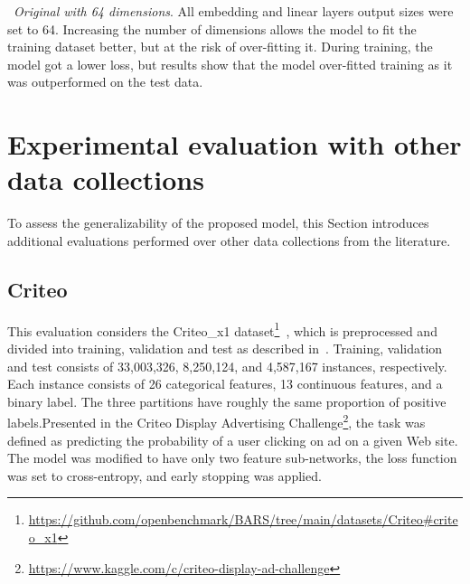 \documentclass[manuscript,nonacm]{acmart}
\begin{document}
\noindent\textbullet~\textit{Original with 64 dimensions}. All embedding and linear layers output sizes were set to 64. Increasing the number of dimensions allows the model to fit the training dataset better, but at the risk of over-fitting it. During training, the model got a lower loss, but results show that the model over-fitted training as it was outperformed on the test data.



\begin{table}
    \centering
    \caption{Results obtained for the evaluated models for the ShareChat dataset.}
    \label{tab:results}\vspace{-1.0cm}
\end{table}

\section{Experimental evaluation with other data collections}\label{sec:evaluation-other}

To assess the generalizability of the proposed model, this Section introduces additional evaluations performed over other data collections from the literature.

\subsection{Criteo}

This evaluation considers the Criteo\_x1 dataset\footnote{\url{https://github.com/openbenchmark/BARS/tree/main/datasets/Criteo\#criteo_x1}}~\cite{bars_ds}, which is preprocessed and divided into training, validation and test as described in~\cite{afn_criteo}. Training, validation and test consists of 33,003,326, 8,250,124, and 4,587,167 instances, respectively. Each instance consists of 26 categorical features, 13 continuous features, and a binary label. The three partitions have roughly the same proportion of positive labels.Presented in the Criteo Display Advertising Challenge\footnote{\url{https://www.kaggle.com/c/criteo-display-ad-challenge}}, the task was defined as predicting the probability of a user clicking on ad on a given Web site. The model was modified to have only two feature sub-networks, the loss function was set to cross-entropy, and early stopping was applied.
\end{document}
